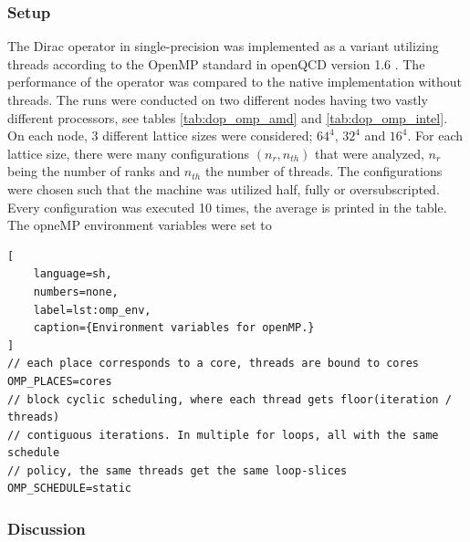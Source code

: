 \documentclass{article}
\theoremstyle{plain} %
\theoremstyle{convention} %
\theoremstyle{remark} %
\numberwithin{equation}{section}
\begin{document}
\subsubsection{Setup}

The Dirac operator in single-precision was implemented as a variant utilizing threads according to the OpenMP standard in openQCD version 1.6 \cite{openqcd}. The performance of the operator was compared to the native implementation without threads. The runs were conducted on two different nodes having two vastly different processors, see tables \ref{tab:dop_omp_amd} and \ref{tab:dop_omp_intel}. On each node, \num{3} different lattice sizes were considered; $64^4$, $32^4$ and $16^4$. For each lattice size, there were many configurations $(n_r,n_{th})$ that were analyzed, $n_r$ being the number of ranks and $n_{th}$ the number of threads. The configurations were chosen such that the machine was utilized half, fully or oversubscripted. Every configuration was executed \num{10} times, the average is printed in the table. The opneMP environment variables were set to

\begin{lstlisting}[
    language=sh,
    numbers=none,
    label=lst:omp_env,
    caption={Environment variables for openMP.}
]
// each place corresponds to a core, threads are bound to cores
OMP_PLACES=cores
// block cyclic scheduling, where each thread gets floor(iteration / threads)
// contiguous iterations. In multiple for loops, all with the same schedule
// policy, the same threads get the same loop-slices
OMP_SCHEDULE=static
\end{lstlisting}

\subsubsection{Discussion}
\end{document}
